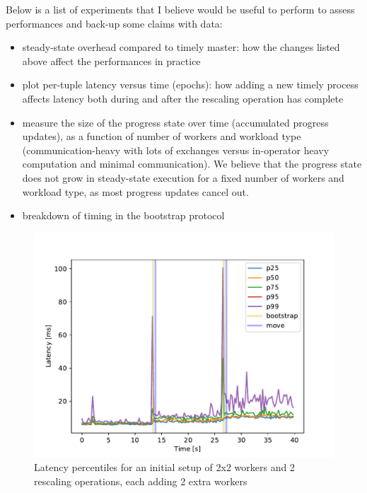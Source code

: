 \documentclass[12pt]{extarticle}
\begin{document}
Below is a list of experiments that I believe would be useful to perform to assess performances and back-up some claims with data:

\begin{itemize}
    \item steady-state overhead compared to timely master: how the changes listed above affect the performances in practice
    \item plot per-tuple latency versus time (epochs): how adding a new timely process affects latency both during and after the
        rescaling operation has complete
    \item measure the size of the progress state over time (accumulated progress updates), as a function of
        number of workers and workload type (communication-heavy with lots of exchanges versus in-operator heavy computation and minimal communication).
        We believe that the progress state does not grow in steady-state execution for a fixed number of workers and workload type, as most progress updates
        cancel out.
    \item breakdown of timing in the bootstrap protocol
\end{itemize}

\begin{figure}[h]
    \centerline{\includegraphics[width=\linewidth]{imgs/latency.pdf}}
    \caption{Latency percentiles for an initial setup of 2x2 workers and 2 rescaling operations, each adding 2 extra workers}
    \label{fig:latency}
\end{figure}
\end{document}
